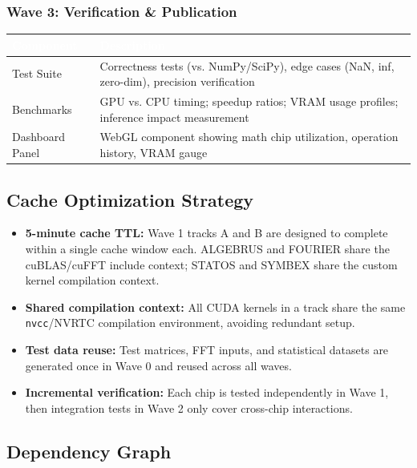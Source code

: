 \documentclass[11pt,letterpaper]{article}
\newcommand{\tableheader}[1]{\textbf{\sffamily\textcolor{white}{#1}}}
\begin{document}
\subsubsection{Wave 3: Verification \& Publication}

\begin{center}
\begin{tabularx}{\textwidth}{L{2.5cm}X}
\toprule
{}
\tableheader{Component} & \tableheader{Description} \\
\midrule
Test Suite & Correctness tests (vs. NumPy/SciPy), edge cases (NaN, inf, zero-dim), precision verification \\
Benchmarks & GPU vs. CPU timing; speedup ratios; VRAM usage profiles; inference impact measurement \\
Dashboard Panel & WebGL component showing math chip utilization, operation history, VRAM gauge \\
\bottomrule
\end{tabularx}
\end{center}

\subsection{Cache Optimization Strategy}

\begin{itemize}[leftmargin=2em]
\item \textbf{5-minute cache TTL:} Wave 1 tracks A and B are designed to complete within a single cache window each. ALGEBRUS and FOURIER share the cuBLAS/cuFFT include context; STATOS and SYMBEX share the custom kernel compilation context.
\item \textbf{Shared compilation context:} All CUDA kernels in a track share the same \texttt{nvcc}/NVRTC compilation environment, avoiding redundant setup.
\item \textbf{Test data reuse:} Test matrices, FFT inputs, and statistical datasets are generated once in Wave 0 and reused across all waves.
\item \textbf{Incremental verification:} Each chip is tested independently in Wave 1, then integration tests in Wave 2 only cover cross-chip interactions.
\end{itemize}

\subsection{Dependency Graph}
\end{document}
